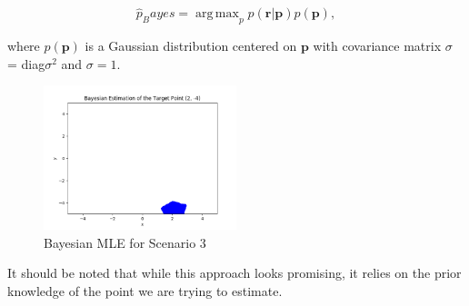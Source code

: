 \documentclass[a4paper]{article}
\DeclareMathOperator*{\argmax}{arg\,max}
\begin{document}
\[
\hat{p}_Bayes = \argmax _p p(\bm{r}|\bm{p}) p(\bm{p}) , 
\]

where $p(\bm{p})$ is a Gaussian distribution centered on $\bm{p}$ with covariance matrix $\sigma$ = diag{$\sigma ^2$} and $\sigma = 1$.

\begin{figure}[h]
	\begin{center}
		\includegraphics[width=0.5\textwidth]{bayesian_mle.png}
		\caption{Bayesian MLE for Scenario 3}
	\end{center}
\end{figure}

It should be noted that while this approach looks promising, it relies on the prior knowledge of the point we are trying to estimate.
\end{document}
